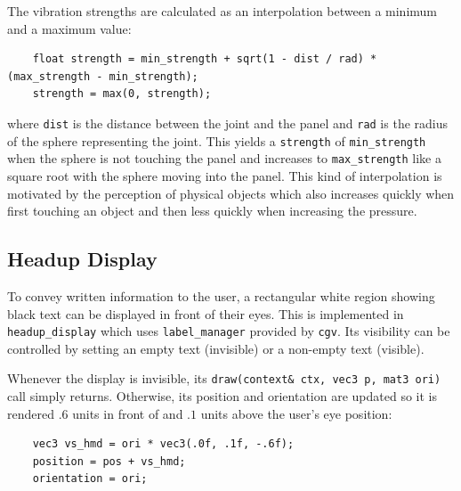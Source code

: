 \documentclass[hyperref, bachelorofscience]{cgvpub}
\begin{document}
The vibration strengths are calculated as an interpolation between a minimum and a maximum value:
\vspace{.3cm}
\begin{lstlisting}
	float strength = min_strength + sqrt(1 - dist / rad) * (max_strength - min_strength);
	strength = max(0, strength);
\end{lstlisting}
where \lstinline|dist| is the distance between the joint and the panel and \lstinline|rad| is the radius of the sphere representing the joint. This yields a \lstinline|strength| of \lstinline|min_strength| when the sphere is not touching the panel and increases to \lstinline|max_strength| like a square root with the sphere moving into the panel. This kind of interpolation is motivated by the perception of physical objects which also increases quickly when first touching an object and then less quickly when increasing the pressure. 

\subsection{Headup Display} \label{sec:hd}
To convey written information to the user, a rectangular white region showing black text can be displayed in front of their eyes. This is implemented in \lstinline|headup_display| which uses \lstinline|label_manager| provided by \lstinline|cgv|. Its visibility can be controlled by setting an empty text (invisible) or a non-empty text (visible).

Whenever the display is invisible, its \lstinline|draw(context& ctx, vec3 p, mat3 ori)| call simply returns. Otherwise, its position and orientation are updated so it is rendered $ .6 $ units in front of and $ .1 $ units above the user's eye position:
\vspace{.3cm}
\begin{lstlisting}
	vec3 vs_hmd = ori * vec3(.0f, .1f, -.6f);
	position = pos + vs_hmd;
	orientation = ori;
\end{lstlisting}
\end{document}
